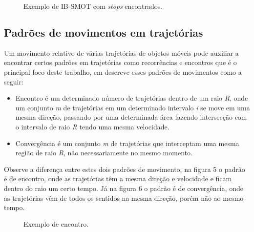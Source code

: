 \documentclass[	12pt, Times, openright, twoside, a4paper, english, brazil]{abntex2}
\begin{document}
\begin{figure}[!ht]
\caption{Exemplo de IB-SMOT com \textit{stops} encontrados.\cite{alvares2007}\label{fig:IB-SMOT}}
\end{figure}

\subsection{Padrões de movimentos em trajetórias}
Um movimento relativo de várias trajetórias de objetos móveis pode auxiliar a encontrar certos padrões em trajetórias como recorrências e encontros que é o principal foco deste trabalho, em \cite{laube2005finding} descreve esses padrões de movimentos como a seguir:
\begin{itemize}
\item Encontro é um determinado número de trajetórias dentro de um raio \textit{R}, onde um conjunto \textit{m} de trajetórias em um determinado intervalo \textit{i} se move em uma mesma direção, passando por uma determinada área fazendo intersecção com o intervalo de raio \textit{R} tendo uma mesma velocidade.
\item Convergência é um conjunto \textit{m} de trajetórias que interceptam uma mesma região de raio \textit{R}, não necessariamente no mesmo momento.
\end{itemize}

Observe a diferença entre estes dois padrões de movimento, na figura 5 o padrão é de encontro, onde as trajetórias têm a mesma direção e velocidade e ficam dentro do raio um certo tempo. Já na figura 6 o padrão é de convergência, onde as trajetórias vêm de todos os sentidos na mesma direção, porém não ao mesmo tempo.

\begin{figure}[ht]
\caption{Exemplo de encontro.\cite{Bogorny2012}\label{fig:encontro}}
\end{figure}
\end{document}

